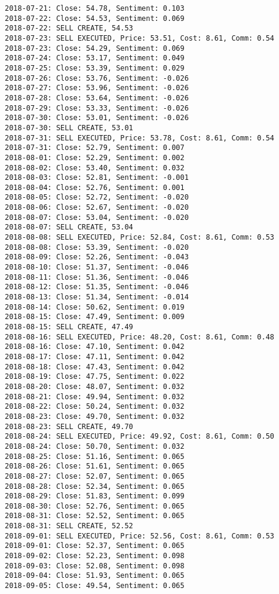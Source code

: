 \documentclass[11pt]{article}
\begin{document}
\begin{Verbatim}[commandchars=\\\{\}]
2018-07-21: Close: 54.78, Sentiment: 0.103
2018-07-22: Close: 54.53, Sentiment: 0.069
2018-07-22: SELL CREATE, 54.53
2018-07-23: SELL EXECUTED, Price: 53.51, Cost: 8.61, Comm: 0.54
2018-07-23: Close: 54.29, Sentiment: 0.069
2018-07-24: Close: 53.17, Sentiment: 0.049
2018-07-25: Close: 53.39, Sentiment: 0.029
2018-07-26: Close: 53.76, Sentiment: -0.026
2018-07-27: Close: 53.96, Sentiment: -0.026
2018-07-28: Close: 53.64, Sentiment: -0.026
2018-07-29: Close: 53.33, Sentiment: -0.026
2018-07-30: Close: 53.01, Sentiment: -0.026
2018-07-30: SELL CREATE, 53.01
2018-07-31: SELL EXECUTED, Price: 53.78, Cost: 8.61, Comm: 0.54
2018-07-31: Close: 52.79, Sentiment: 0.007
2018-08-01: Close: 52.29, Sentiment: 0.002
2018-08-02: Close: 53.40, Sentiment: 0.032
2018-08-03: Close: 52.81, Sentiment: -0.001
2018-08-04: Close: 52.76, Sentiment: 0.001
2018-08-05: Close: 52.72, Sentiment: -0.020
2018-08-06: Close: 52.67, Sentiment: -0.020
2018-08-07: Close: 53.04, Sentiment: -0.020
2018-08-07: SELL CREATE, 53.04
2018-08-08: SELL EXECUTED, Price: 52.84, Cost: 8.61, Comm: 0.53
2018-08-08: Close: 53.39, Sentiment: -0.020
2018-08-09: Close: 52.26, Sentiment: -0.043
2018-08-10: Close: 51.37, Sentiment: -0.046
2018-08-11: Close: 51.36, Sentiment: -0.046
2018-08-12: Close: 51.35, Sentiment: -0.046
2018-08-13: Close: 51.34, Sentiment: -0.014
2018-08-14: Close: 50.62, Sentiment: 0.019
2018-08-15: Close: 47.49, Sentiment: 0.009
2018-08-15: SELL CREATE, 47.49
2018-08-16: SELL EXECUTED, Price: 48.20, Cost: 8.61, Comm: 0.48
2018-08-16: Close: 47.10, Sentiment: 0.042
2018-08-17: Close: 47.11, Sentiment: 0.042
2018-08-18: Close: 47.43, Sentiment: 0.042
2018-08-19: Close: 47.75, Sentiment: 0.022
2018-08-20: Close: 48.07, Sentiment: 0.032
2018-08-21: Close: 49.94, Sentiment: 0.032
2018-08-22: Close: 50.24, Sentiment: 0.032
2018-08-23: Close: 49.70, Sentiment: 0.032
2018-08-23: SELL CREATE, 49.70
2018-08-24: SELL EXECUTED, Price: 49.92, Cost: 8.61, Comm: 0.50
2018-08-24: Close: 50.70, Sentiment: 0.032
2018-08-25: Close: 51.16, Sentiment: 0.065
2018-08-26: Close: 51.61, Sentiment: 0.065
2018-08-27: Close: 52.07, Sentiment: 0.065
2018-08-28: Close: 52.34, Sentiment: 0.065
2018-08-29: Close: 51.83, Sentiment: 0.099
2018-08-30: Close: 52.76, Sentiment: 0.065
2018-08-31: Close: 52.52, Sentiment: 0.065
2018-08-31: SELL CREATE, 52.52
2018-09-01: SELL EXECUTED, Price: 52.56, Cost: 8.61, Comm: 0.53
2018-09-01: Close: 52.37, Sentiment: 0.065
2018-09-02: Close: 52.23, Sentiment: 0.098
2018-09-03: Close: 52.08, Sentiment: 0.098
2018-09-04: Close: 51.93, Sentiment: 0.065
2018-09-05: Close: 49.54, Sentiment: 0.065

\end{Verbatim}
\end{document}

